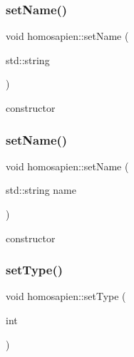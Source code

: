 \mbox{\label{classhomosapien_a0b0de2b72513ee20ba408ea29865e5f4}} 
\subsubsection{\texorpdfstring{set\+Name()}{setName()}\hspace{0.1cm}{\footnotesize\ttfamily [1/2]}}
{\footnotesize\ttfamily void homosapien\+::set\+Name (\begin{DoxyParamCaption}\item[{std\+::string}]{ }\end{DoxyParamCaption})}



constructor 

\mbox{\label{classhomosapien_a0b0de2b72513ee20ba408ea29865e5f4}} 
\subsubsection{\texorpdfstring{set\+Name()}{setName()}\hspace{0.1cm}{\footnotesize\ttfamily [2/2]}}
{\footnotesize\ttfamily void homosapien\+::set\+Name (\begin{DoxyParamCaption}\item[{std\+::string}]{name }\end{DoxyParamCaption})}



constructor 

\mbox{\label{classhomosapien_aa868001c96c4c26e5cbe85d7d75c738e}} 
\subsubsection{\texorpdfstring{set\+Type()}{setType()}\hspace{0.1cm}{\footnotesize\ttfamily [1/2]}}
{\footnotesize\ttfamily void homosapien\+::set\+Type (\begin{DoxyParamCaption}\item[{int}]{ }\end{DoxyParamCaption})}

